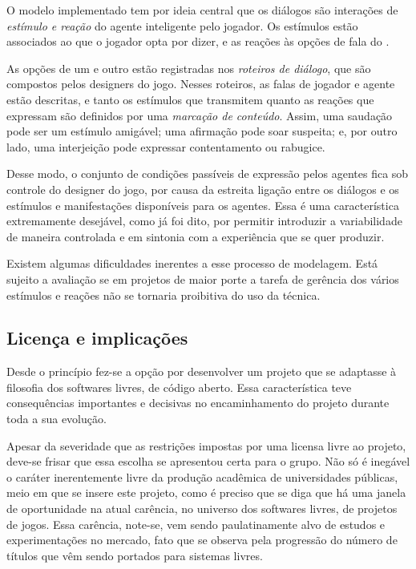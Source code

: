 O modelo implementado tem por ideia central que os diálogos são
interações de \emph{estímulo e reação} do agente inteligente pelo
jogador. Os estímulos estão associados ao que o jogador opta por
dizer, e as reações às opções de fala do \npc. 

As opções de um e outro estão registradas nos \emph{roteiros de
  diálogo}, que são compostos pelos designers do jogo. Nesses
roteiros, as falas de jogador e agente estão descritas, e tanto os
estímulos que transmitem quanto as reações que expressam são definidos
por uma \emph{marcação de conteúdo}. Assim, uma saudação pode ser um
estímulo amigável; uma afirmação pode soar suspeita; e, por outro
lado, uma interjeição pode expressar contentamento ou rabugice.

Desse modo, o conjunto de condições passíveis de
expressão pelos agentes fica sob controle do designer do jogo, por
causa da estreita ligação entre os diálogos e os estímulos e
manifestações disponíveis para os agentes. Essa é uma característica
extremamente desejável, como já foi dito, por permitir introduzir a
variabilidade de maneira controlada e em sintonia com a experiência
que se quer produzir.

Existem algumas dificuldades inerentes a esse processo de
modelagem. Está sujeito a avaliação se em projetos de maior porte a
tarefa de gerência dos vários estímulos e reações não se tornaria
proibitiva do uso da técnica.

\subsection{Licença e implicações}

Desde o princípio fez-se a opção por desenvolver um projeto que se adaptasse à filosofia dos softwares livres, de código aberto. Essa característica teve consequências importantes e decisivas no encaminhamento do projeto durante toda a sua evolução. 

Apesar da severidade que as restrições impostas por uma licensa livre ao projeto, deve-se frisar que essa escolha se apresentou certa para o grupo. Não só é inegável o caráter inerentemente livre da produção acadêmica de universidades públicas, meio em que se insere este projeto, como é preciso que se diga que há uma janela de oportunidade na atual carência, no universo dos softwares livres, de projetos de jogos. Essa carência, note-se, vem sendo paulatinamente alvo de estudos e experimentações no mercado, fato que se observa pela progressão do número de títulos que vêm sendo portados para sistemas livres.

